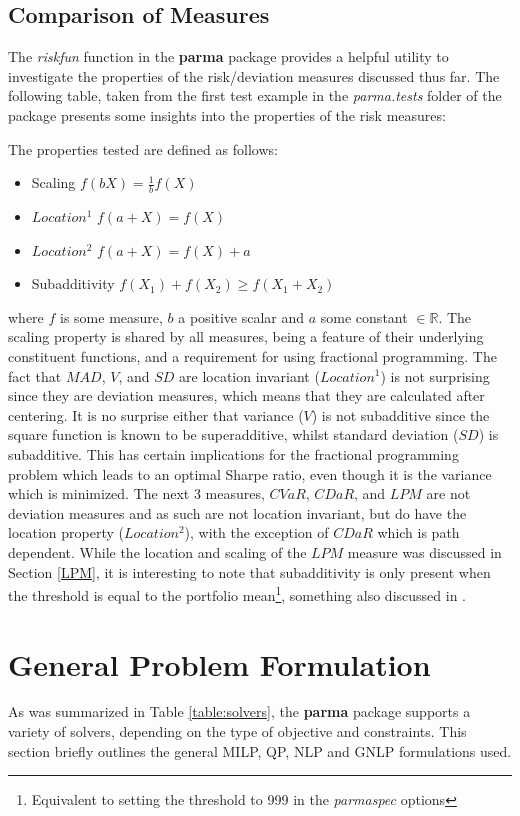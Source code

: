 \subsection{Comparison of Measures}\label{comparison}
The \emph{riskfun} function in the \textbf{parma} package provides a helpful utility
to investigate the properties of the risk/deviation measures discussed thus far. The
following table, taken from the first test example in the \emph{parma.tests} folder of the
package presents some insights into the properties of the risk measures:

The properties tested are defined as follows:
\begin{itemize}
\item Scaling $f(bX)=\frac{1}{b}f(X)$
\item $Location^{1}$ $f(a+X)=f(X)$
\item $Location^{2}$ $f(a+X)=f(X)+a$
\item Subadditivity $f(X_1)+f(X_2)\ge f(X_1+X_2)$
\end{itemize}
where $f$ is some measure, $b$ a positive scalar and $a$ some constant $\in \mathbb{R}$.
The scaling property is shared by all measures, being a feature of their underlying constituent functions,
and a requirement for using fractional programming. The fact that $MAD$, $V$, and $SD$ are location
invariant ($Location^{1}$) is not surprising since they are deviation measures, which means that they
are calculated after centering. It is no surprise either that variance ($V$) is not subadditive since
the square function is known to be superadditive,  whilst standard deviation ($SD$) is subadditive. This has
certain implications for the fractional programming problem which leads to an optimal Sharpe ratio, even
though it is the variance which is minimized. The next 3 measures, $CVaR$, $CDaR$, and $LPM$ are not
deviation measures and as such are not location invariant, but do have the location property ($Location^{2}$),
with the exception of $CDaR$ which is path dependent. While the location and scaling of the $LPM$ measure was
discussed in Section \ref{LPM}, it is interesting to note that subadditivity is only present when
the threshold is equal to the portfolio mean\footnote{Equivalent to setting the threshold to 999 in
the \emph{parmaspec} options }, something also discussed in \citet{Brogan2005}.
\section{General Problem Formulation}\label{sec:3}
As was summarized in Table \ref{table:solvers}, the \textbf{parma} package
supports a variety of solvers, depending on the type of objective and
constraints. This section briefly outlines the general MILP, QP, NLP and GNLP
formulations used.
